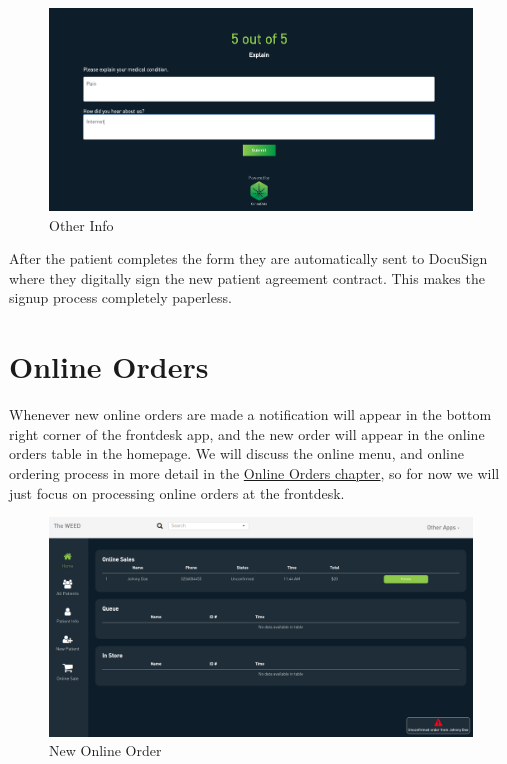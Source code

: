 \documentclass[]{book}
\theoremstyle{definition}
\theoremstyle{definition}
\theoremstyle{definition}
\theoremstyle{remark}
\begin{document}
\begin{figure}
\centering
\includegraphics{images/S5.png}
\caption{Other Info}
\end{figure}

After the patient completes the form they are automatically sent to
DocuSign where they digitally sign the new patient agreement contract.
This makes the signup process completely paperless.

\hypertarget{online-orders}{\section{Online
Orders}\label{online-orders}}

Whenever new online orders are made a notification will appear in the
bottom right corner of the frontdesk app, and the new order will appear
in the online orders table in the homepage. We will discuss the online
menu, and online ordering process in more detail in the
\href{online.html}{Online Orders chapter}, so for now we will just focus
on processing online orders at the frontdesk.

\begin{figure}
\centering
\includegraphics{images/online1.png}
\caption{New Online Order}
\end{figure}
\end{document}

